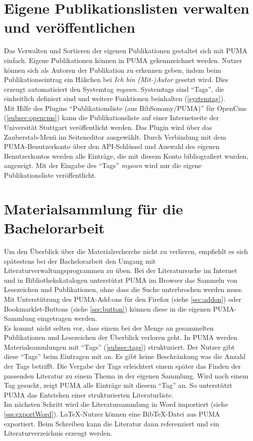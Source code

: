 \section{Eigene Publikationslisten verwalten und veröffentlichen}
\label{sec:eigenePublistenVerwalten}
Das Verwalten und Sortieren der eigenen Publikationen gestaltet sich mit PUMA einfach. Eigene  Publikationen können in PUMA gekennzeichnet werden. Nutzer können sich als Autoren der Publikation zu erkennen geben, indem beim Publikationseintrag ein Häkchen bei \textit{Ich bin (Mit-)Autor} gesetzt wird. Dies erzeugt automatisiert den Systemtag \textit{myown}. Systemtags sind \enquote{Tags}, die einheitlich definiert sind und weitere Funktionen beinhalten (\autoref{systemtag}).\\
Mit Hilfe des Plugins \enquote{Publikationsliste (aus BibSonomy/PUMA)} für OpenCms (\autoref{subsec:opencms}) kann die Publikationsliste auf einer Internetseite der Universität Stuttgart veröffentlicht werden. Das Plugin wird über das Zauberstab-Menü im Seiteneditor ausgewählt. Durch Verbindung mit dem PUMA-Benutzerkonto über den API-Schlüssel und Auswahl des eigenen Benutzerkontos werden alle Einträge, die mit diesem Konto bibliografiert wurden, angezeigt. Mit der Eingabe des \enquote{Tags} \textit{myown} wird nur die eigene Publikationsliste veröffentlicht.



\section{Materialsammlung für die Bachelorarbeit}
\label{sec:materialsammlungBachelorarbeit}
Um den Überblick über die Materialrecherche nicht zu verlieren, empfiehlt es sich spätestens bei der Bachelorarbeit den Umgang mit Literaturverwaltungsprogrammen zu üben. Bei der Literatursuche im Internet und in Bibliothekskatalogen unterstützt PUMA im Browser das Sammeln von Lesezeichen und Publikationen, ohne dass die Suche unterbrochen werden muss. Mit Unterstützung des PUMA-Add-ons für den Firefox (siehe \autoref{sec:addon}) oder Bookmarklet-Buttons (siehe \autoref{sec:button}) können diese in die eigenen PUMA-Sammlung eingetragen werden.\\
Es kommt nicht selten vor, dass einem bei der Menge an gesammelten Publikationen und Lesezeichen der Überblick verloren geht. In PUMA werden Materialsammlungen mit \enquote{Tags} (\autoref{subsec:tags}) strukturiert. Der Nutzer gibt diese \enquote{Tags} beim Eintragen mit an. Es gibt keine Beschränkung was die Anzahl der Tags betrifft. Die Vergabe der Tags erleichtert einem später das Finden der passenden Literatur zu einem Thema in der eigenen Sammlung. Wird nach einem Tag gesucht, zeigt PUMA alle Einträge mit diesem \enquote{Tag} an. So unterstützt PUMA das Entstehen einer strukturierten Literaturliste.\\
Im nächsten Schritt wird die Literatursammlung in Word importiert (siehe \autoref{sss:exportWord}). LaTeX-Nutzer können eine BibTeX-Datei aus PUMA exportiert. Beim Schreiben kann die Literatur dann referenziert und ein Literaturverzeichnis erzeugt werden.
